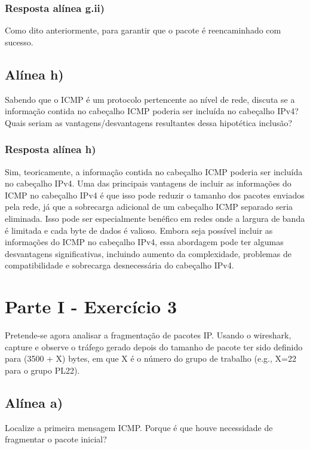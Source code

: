 \documentclass{article}
\begin{document}
\subsubsection{Resposta alínea g.ii)}
Como dito anteriormente, para garantir que o pacote é reencaminhado com sucesso.

\subsection{Alínea h)}

Sabendo que o ICMP é um protocolo pertencente ao nível de rede, discuta se a informação contida no cabeçalho
ICMP poderia ser incluída no cabeçalho IPv4? Quais seriam as vantagens/desvantagens resultantes dessa
hipotética inclusão?

\subsubsection{Resposta alínea h)}

Sim, teoricamente, a informação contida no cabeçalho ICMP poderia ser incluída no cabeçalho IPv4.
Uma das principais vantagens de incluir as informações do ICMP no cabeçalho IPv4 é que isso pode reduzir o tamanho dos pacotes enviados pela rede, já que a sobrecarga adicional de um cabeçalho ICMP separado seria eliminada. Isso pode ser especialmente benéfico em redes onde a largura de banda é limitada e cada byte de dados é valioso.
Embora seja possível incluir as informações do ICMP no cabeçalho IPv4, essa abordagem pode ter algumas desvantagens significativas, incluindo aumento da complexidade, problemas de compatibilidade e sobrecarga desnecessária do cabeçalho IPv4.

\pagebreak

\section{Parte I - Exercício 3}

Pretende-se agora analisar a fragmentação de pacotes IP. Usando o wireshark, capture e observe o tráfego gerado depois do
tamanho de pacote ter sido definido para (3500 + X) bytes, em que X é o número do grupo de trabalho (e.g., X=22 para o grupo
PL22).

\subsection{Alínea a)}

Localize a primeira mensagem ICMP. Porque é que houve necessidade de fragmentar o pacote inicial?
\end{document}
